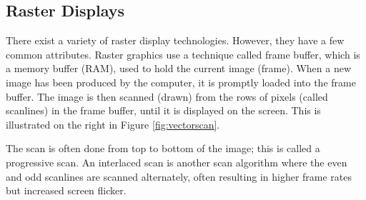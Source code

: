 \subsection{Raster Displays}
There exist a variety of raster display technologies.
However, they have a few common attributes.
Raster graphics use a technique called frame buffer, which is a memory buffer (RAM), used to hold the current image (frame).
When a new image has been produced by the computer, it is promptly loaded into the frame buffer.
The image is then scanned (drawn) from the rows of pixels (called scanlines) in the frame buffer, until it is displayed on the screen.
This is illustrated on the right in Figure \ref{fig:vectorscan}.

The scan is often done from top to bottom of the image; this is called a progressive scan.
An interlaced scan is another scan algorithm where the even and odd scanlines are scanned alternately, often resulting in higher frame rates but increased screen flicker.